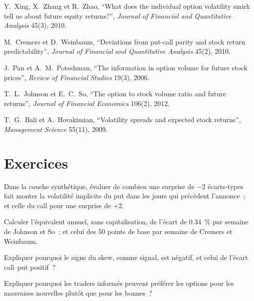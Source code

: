 \begin{omsources}
\item Y.~Xing, X.~Zhang et R.~Zhao, ``What does the individual option volatility smirk tell us about future equity returns?'', \emph{Journal of Financial and
Quantitative Analysis} 45(3), 2010.
\item M.~Cremers et D.~Weinbaum, ``Deviations from put-call parity and stock return predictability'', \emph{Journal of Financial and Quantitative Analysis}
45(2), 2010.
\item J.~Pan et A.~M.~Poteshman, ``The information in option volume for future stock prices'', \emph{Review of Financial Studies} 19(3), 2006.
\item T.~L.~Johnson et E.~C.~So, ``The option to stock volume ratio and future returns'', \emph{Journal of Financial Economics} 106(2), 2012.
\item T.~G.~Bali et A.~Hovakimian, ``Volatility spreads and expected stock returns'', \emph{Management Science} 55(11), 2009.
\end{omsources}

\section{Exercices}

\begin{exercise}[$\star$]\label{exo:s1:options-implied-signals-for-stocks:1}
Dans la couche synthétique, évaluer de combien une surprise de $-2$ écarts-types fait monter la volatilité implicite du put dans les jours qui précèdent l'annonce~; et
celle du call pour une surprise de $+2$.
\end{exercise}

\begin{exercise}[$\star$]\label{exo:s1:options-implied-signals-for-stocks:2}
Calculer l'équivalent annuel, sans capitalisation, de l'écart de 0.34~\% par semaine de Johnson et So~; et celui des 50 points de base par semaine de Cremers et Weinbaum.
\end{exercise}

\begin{exercise}[$\star$]\label{exo:s1:options-implied-signals-for-stocks:3}
Expliquer pourquoi le signe du skew, comme signal, est négatif, et celui de l'écart call--put positif~?
\end{exercise}

\begin{exercise}[$\star\star$]\label{exo:s1:options-implied-signals-for-stocks:4}
Expliquer pourquoi les traders informés peuvent préférer les options pour les mauvaises nouvelles plutôt que pour les bonnes~?
\end{exercise}

